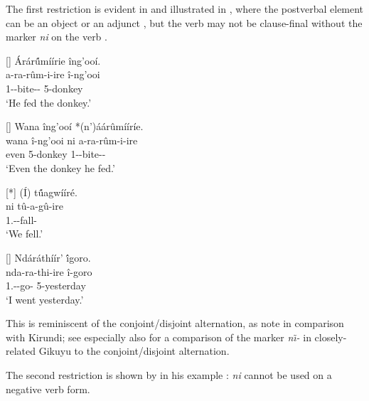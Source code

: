 \documentclass[output=paper]{langscibook}
\begin{document}
The first restriction is evident in \citet[46]{Muriungi2005} and illustrated in , where the postverbal element can be an object  or an adjunct , but the verb may not be clause-final without the marker \textit{ni} on the verb .

\ea
\label{bkm:Ref132275141}
\ea
[]{
\label{bkm:Ref132275141:a}
Árár\'{û}míírie îng’ooí.\\
\gll
a-ra-rûm-i-ire  î-ng’ooi\\
1\SM-\YPST{}-bite-\IC-\PFV{}  5-donkey\\
\glt
‘He fed the donkey.’
}

\ex
[]{
\label{bkm:Ref132275141:b}
Wana îng’ooí *(n’)áárûmííríe.\\
\gll
wana  î-ng’ooi  ni  a-ra-rûm-i-ire\\
even  5-donkey \FOC{}  1\SM-\YPST{}-bite-\IC-\PFV\\
\glt
‘Even the donkey he fed.’
}



\ex
[*]{
\label{bkm:Ref132275141:c}
(Í) t\'{û}agwííré.\\
\gll
ni  tû-a-gû-ire\\
\FOC{}  1\PL.\SM-\PST{}-fall-\PFV{}\\
\glt
‘We fell.’
}


\ex
[]{
\label{bkm:Ref132275141:d}
Ndáráthíír’ \'{î}goro.\\
\gll
nda-ra-thi-ire  î-goro\\
1\SG.\SM{}-\YPST{}-go-\PFV{} 5-yesterday\\
\glt
‘I went yesterday.’
}

\z
\z

This is reminiscent of the conjoint/disjoint alternation, as \citet[728]{AbelsMuriungi2008} note in comparison with Kirundi; see especially also \citet{Morimoto2017} for a comparison of the marker \textit{n\~\i-} in closely-related Gikuyu to the conjoint\slash disjoint alternation.

The second restriction is shown by \citet[80]{Muriungi2005} in his example : \textit{ni} cannot be used on a negative verb form.
\end{document}
